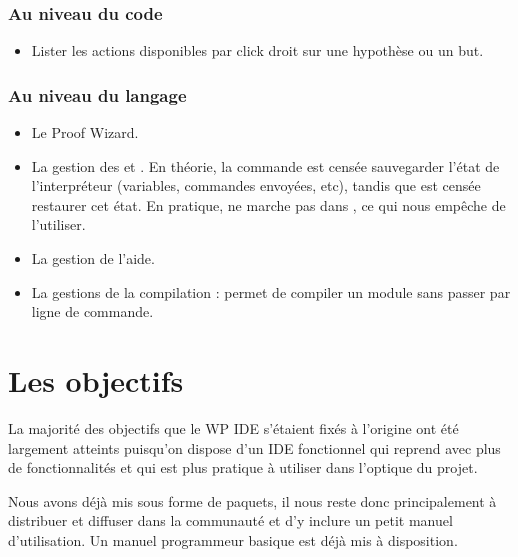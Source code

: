 \subsubsection{Au niveau du code}

\begin{itemize}
    \item Lister les actions disponibles par click droit sur une hypothèse ou un but.
\end{itemize}

\subsubsection{Au niveau du langage}

\begin{itemize}
    \item Le Proof Wizard.
    \item La gestion des  et . En théorie, la commande  est censée sauvegarder l'état de l'interpréteur (variables, commandes envoyées, etc), tandis que  est censée restaurer cet état.
En pratique,  ne marche pas dans \coqtop{}, ce qui nous empêche de l'utiliser.
    \item La gestion de l'aide.
    \item La gestions de la compilation : \CoqIde{} permet de compiler un module sans passer par ligne de commande.
\end{itemize}

\section{Les objectifs}

La majorité des objectifs que le WP IDE s'étaient fixés à l'origine ont été largement atteints puisqu'on dispose d'un IDE fonctionnel qui reprend \CoqIde{} avec plus de fonctionnalités et qui est plus pratique à utiliser dans l'optique du projet.

Nous avons déjà mis \CoquilleIDE{} sous forme de paquets, il nous reste donc principalement à distribuer et diffuser \CoquilleIDE{} dans la communauté \Coq{} et d'y inclure un petit manuel d'utilisation. Un manuel programmeur basique est déjà mis à disposition.
